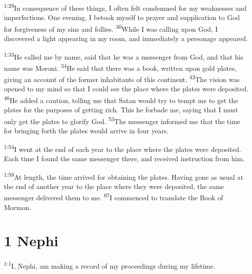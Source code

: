 \documentclass[openany,12pt,english]{book}
\newenvironment{para}{\par\pretolerance=100\tolerance=200\setlength{\emergencystretch}{0.6em}\relax}{\par}
\begin{document}
\begin{para}
    \textsuperscript{1:29}\thinspace{}In con\-se\-quence of these things, I of\-ten felt condemned for my weaknesses and imperfections. One eve\-ning, I be\-took my\-self to pray\-er and sup\-pli\-ca\-tion to God for for\-give\-ness of my sins and follies.
    \textsuperscript{30}\thinspace{}While I was call\-ing up\-on God, I discovered a light appearing in my room, and im\-me\-di\-ate\-ly a per\-son\-age appeared.
\end{para}

\begin{para}
    \textsuperscript{1:33}\thinspace{}He called me by name, said that he was a mes\-sen\-ger from God, and that his name was Moroni.
    \textsuperscript{34}\thinspace{}He said that there was a book, writ\-ten up\-on gold plates, giv\-ing an ac\-count of the for\-mer inhabitants of this con\-ti\-nent.
    \textsuperscript{42}\thinspace{}The vi\-sion was opened to my mind so that I could see the place where the plates were deposited.
    \textsuperscript{46}\thinspace{}He added a cau\-tion, tell\-ing me that Satan would try to tempt me to get the plates for the purposes of get\-ting rich. This he for\-bade me, say\-ing that I must on\-ly get the plates to glo\-ri\-fy God.
    \textsuperscript{53}\thinspace{}The mes\-sen\-ger in\-formed me that the time for bring\-ing forth the plates would ar\-rive in four years.
\end{para}

\bigskip{}

\begin{para}
    \textsuperscript{1:54}\thinspace{}I went at the end of each year to the place where the plates were deposited. Each time I found the same mes\-sen\-ger there, and re\-ceived in\-struc\-tion from him.
\end{para}

\begin{para}
    \textsuperscript{1:59}\thinspace{}At length, the time ar\-rived for obtaining the plates. Hav\-ing gone as u\-su\-al at the end of an\-oth\-er year to the place where they were deposited, the same mes\-sen\-ger delivered them to me.
    \textsuperscript{67}\thinspace{}I com\-menced to trans\-late the Book of Mormon.
\end{para}

\section*{1 Nephi}
\begin{para}
    \textsuperscript{1:1}\thinspace{}I, Nephi, am mak\-ing a rec\-ord of my proceedings dur\-ing my life\-time.
\end{para}
\end{document}
